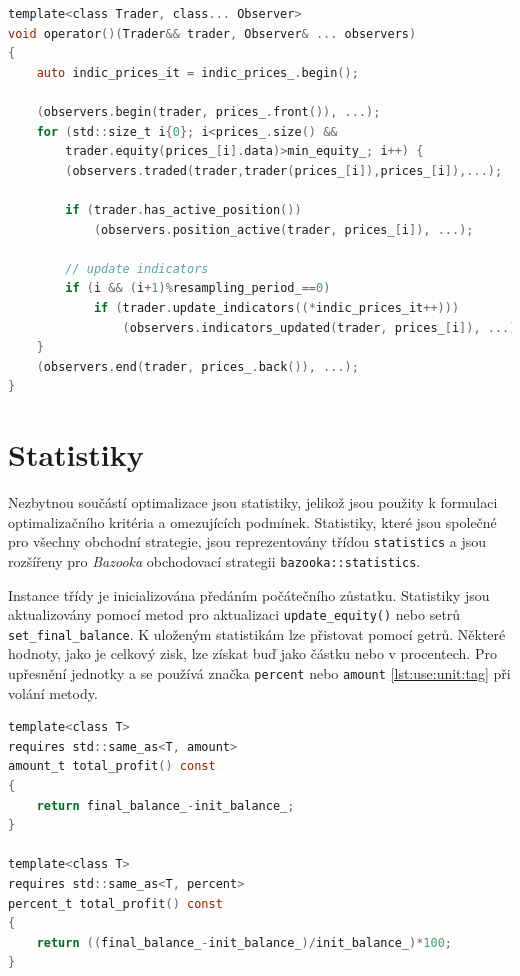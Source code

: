 \begin{lstlisting}[caption={~Implementace simulace obchodování},label={lst:simulator},captionpos=t,abovecaptionskip=-\medskipamount,belowcaptionskip=\medskipamount,language=C]
template<class Trader, class... Observer>
void operator()(Trader&& trader, Observer& ... observers)
{
    auto indic_prices_it = indic_prices_.begin();

    (observers.begin(trader, prices_.front()), ...);
    for (std::size_t i{0}; i<prices_.size() &&
        trader.equity(prices_[i].data)>min_equity_; i++) {
        (observers.traded(trader,trader(prices_[i]),prices_[i]),...);

        if (trader.has_active_position())
            (observers.position_active(trader, prices_[i]), ...);

        // update indicators
        if (i && (i+1)%resampling_period_==0)
            if (trader.update_indicators((*indic_prices_it++)))
                (observers.indicators_updated(trader, prices_[i]), ...);
    }
    (observers.end(trader, prices_.back()), ...);
}
\end{lstlisting}

\section{Statistiky}
Nezbytnou součástí optimalizace jsou statistiky, jelikož jsou použity k formulaci optimalizačního kritéria a omezujících podmínek.
Statistiky, které jsou společné pro všechny obchodní strategie, jsou reprezentovány třídou \texttt{statistics} a jsou rozšířeny pro \textit{Bazooka} obchodovací strategii \texttt{bazooka::statistics}.

Instance třídy je inicializována předáním počátečního zůstatku.
Statistiky jsou aktualizovány pomocí metod pro aktualizaci \texttt{update\_equity()} nebo setrů \texttt{set\_final\_balance}.
K uloženým statistikám lze přistovat pomocí getrů.
Některé hodnoty, jako je celkový zisk, lze získat buď jako částku nebo v procentech.
Pro upřesnění jednotky a se používá značka \texttt{percent} nebo \texttt{amount} \ref{lst:use:unit:tag} při volání metody.

\begin{lstlisting}[caption={~Metody pro získání celkového zisku v různých jednotkách},label={lst:use:unit:tag},captionpos=t,abovecaptionskip=-\medskipamount,belowcaptionskip=\medskipamount,language=C]
template<class T>
requires std::same_as<T, amount>
amount_t total_profit() const
{
    return final_balance_-init_balance_;
}

template<class T>
requires std::same_as<T, percent>
percent_t total_profit() const
{
    return ((final_balance_-init_balance_)/init_balance_)*100;
}
\end{lstlisting}

